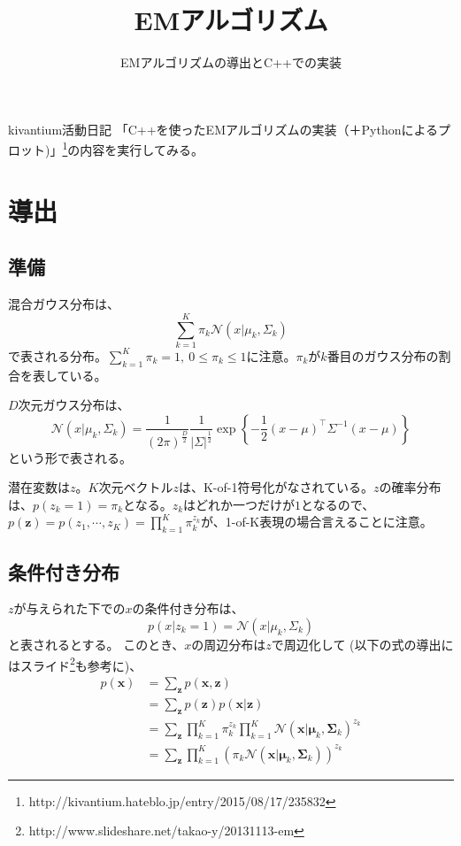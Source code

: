 \documentclass[a4paper,10.5pt]{jsarticle}  %
\begin{document}
\title{EMアルゴリズム}
\author{EMアルゴリズムの導出とC++での実装}
\maketitle
kivantium活動日記 「C++を使ったEMアルゴリズムの実装（＋Pythonによるプロット)」\footnote{http://kivantium.hateblo.jp/entry/2015/08/17/235832}の内容を実行してみる。

\section{導出}
\subsection{準備}
混合ガウス分布は、\begin{equation}\sum_{k=1}^{K} \pi_k \mathcal{N} (x|\mu_k, \Sigma_k)\end{equation}で表される分布。$\sum_{k=1}^{K} \pi_k = 1, \ 0\leq\pi_k\leq 1$に注意。$\pi_k$が$k$番目のガウス分布の割合を表している。\par
$D$次元ガウス分布は、\begin{equation} \mathcal{N} (x|\mu_k, \Sigma_k) = \frac{1}{(2 \pi)^{\frac{D}{2}}} \frac{1}{|\Sigma|^{\frac{1}{2}}} \exp \left\{ -\frac{1}{2} (x-\mu)^\top \Sigma^{-1} (x-\mu)   \right\} \end{equation}という形で表される。\par
潜在変数は$z$。$K$次元ベクトル$z$は、K-of-1符号化がなされている。$z$の確率分布は、$p(z_k = 1)= \pi_k$となる。$z_k$はどれか一つだけが$1$となるので、$p(\mathbf{z}) = p(z_1, \cdots, z_K) = \prod_{k=1}^K \pi_k^{z_k}$が、1-of-K表現の場合言えることに注意。

\subsection{条件付き分布}
$z$が与えられた下での$x$の条件付き分布は、\begin{equation} p(x|z_k=1) = \mathcal{N}(x|\mu_k,\Sigma_k)  \end{equation}と表されるとする。
このとき、$x$の周辺分布は$z$で周辺化して (以下の式の導出にはスライド\footnote{http://www.slideshare.net/takao-y/20131113-em}も参考に)、
\begin{align} p(\mathbf{x}) &= \sum_{\mathbf{z}} p(\mathbf{x},\mathbf{z})\\
																	 &= \sum_{\mathbf{z}} p(\mathbf{z}) p(\mathbf{x}|\mathbf{z})\\
																	 &= \sum_{\mathbf{z}} \prod_{k=1}^{K} \pi_{k}^{z_k} \prod_{k=1}^{K} \mathcal{N} (\mathbf{x}|\boldsymbol{\mu}_k, \boldsymbol{\Sigma}_k)^{z_k}\\
																 &= \sum_{\mathbf{z}} \prod_{k=1}^{K} (\pi_{k} \mathcal{N} (\mathbf{x}|\boldsymbol{\mu}_k, \boldsymbol{\Sigma}_k))^{z_k}
\end{align}
\end{document}
